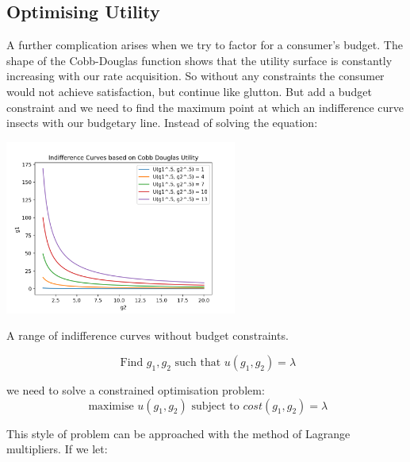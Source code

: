 \documentclass{tufte-handout}
\begin{document}
\subsection{Optimising Utility}
A further complication arises when  we try to factor for a consumer's budget. The shape of the Cobb-Douglas function shows that the utility surface is constantly increasing with our rate acquisition. So without any constraints the consumer would not achieve satisfaction, but continue like glutton. But add a budget constraint and we need to find the maximum point at which an indifference curve insects with our budgetary line. Instead of solving the equation: 

\begin{marginfigure}
\includegraphics[width=3in, height=5.in]{Plots/indifference_curves.png}
\caption{A range of indifference curves without budget constraints.}
\end{marginfigure}

$$ \text{ Find } g_{1}, g_{2} \text{ such that } u(g_{1}, g_{2}) = \lambda $$

\noindent we need to solve a constrained optimisation problem: 
$$ \text{ maximise } u(g_{1}, g_{2})  \text{ subject to } cost(g_{1}, g_{2}) =  \lambda$$

\noindent This style of problem can be approached with the method of Lagrange multipliers. If we let:
\end{document}
